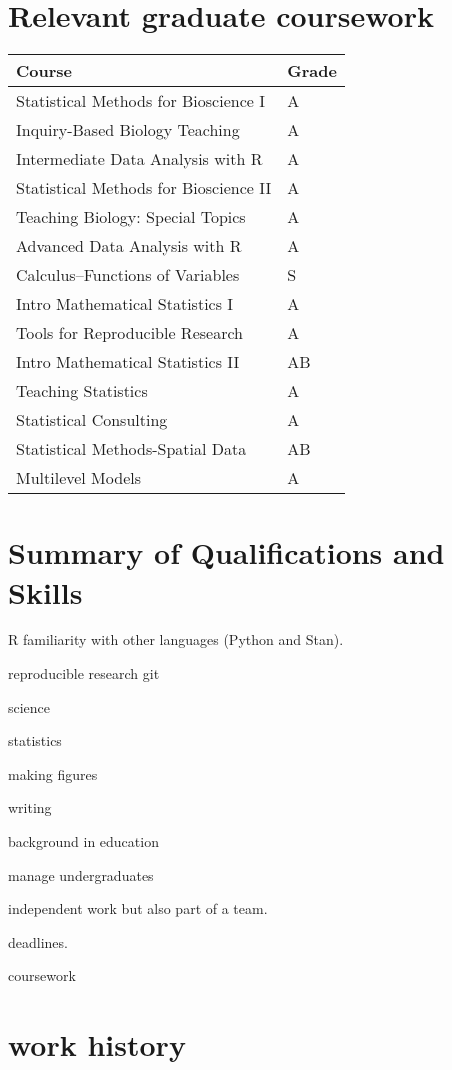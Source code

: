 \documentclass{article}
\begin{document}
\section*{Relevant graduate coursework}
\label{sec:org3b90026}
\begin{center}
\begin{tabular}{ll}
Course & Grade\\
\hline
Statistical Methods for Bioscience I & A\\
Inquiry-Based Biology Teaching & A\\
Intermediate Data Analysis with R & A\\
Statistical Methods for Bioscience II & A\\
Teaching Biology: Special Topics & A\\
Advanced Data Analysis with R & A\\
Calculus--Functions of Variables & S\\
Intro Mathematical Statistics I & A\\
Tools for Reproducible Research & A\\
Intro Mathematical Statistics II & AB\\
Teaching Statistics & A\\
Statistical Consulting & A\\
Statistical Methods-Spatial Data & AB\\
Multilevel Models & A\\
\end{tabular}
\end{center}

\section*{Summary of Qualifications and Skills}
\label{sec:orgddc6346}

R
familiarity with other languages (Python and Stan).

reproducible research git

science

statistics

making figures

writing

background in education

manage undergraduates

independent work but also part of a team.

deadlines.

coursework

\section*{work history}
\label{sec:orga9c650e}
\end{document}
